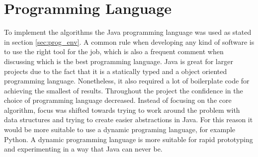 \section{Programming Language}
\label{ap:prog_lang_eval}
To implement the algorithms the Java programming language was used as stated in section \ref{sec:prog_env}. A common rule when developing any kind of software is to use the right tool for the job, which is also a frequent comment when discussing which is the best programming language. Java is great for larger projects due to the fact that it is a statically typed and a object oriented programming language. Nonetheless, it also required a lot of boilerplate code for achieving the smallest of results. Throughout the project the confidence in the choice of programming language decreased. Instead of focusing on the core algorithm, focus was shifted towards trying to work around the problem with data structures and trying to create easier abstractions in Java. For this reason it would be more suitable to use a dynamic programing language, for example Python. A dynamic programming language is more suitable for rapid prototyping and experimenting in a way that Java can never be. 